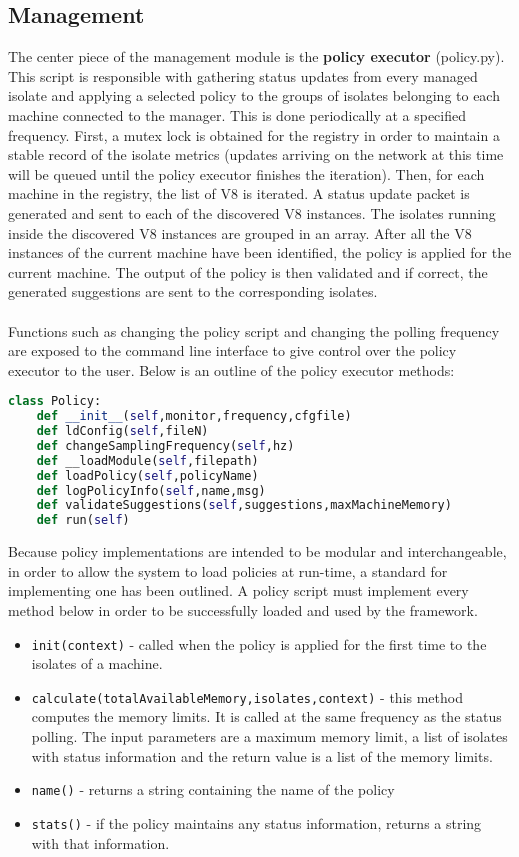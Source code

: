 \documentclass{l4proj}
\begin{document}
\subsection{Management}
\hspace*{3em} The center piece of the management module is the \textbf{policy executor} (policy.py). This script is responsible with gathering status updates from every managed isolate and applying a selected policy to the groups of isolates belonging to each machine connected to the manager. This is done periodically at a specified frequency. First, a mutex lock is obtained for the registry in order to maintain a stable record of the isolate metrics (updates arriving on the network at this time will be queued until the policy executor finishes the iteration). Then, for each machine in the registry, the list of V8 is iterated. A status update packet is generated and sent to each of the discovered V8 instances. The isolates running inside the discovered V8 instances are grouped in an array. After all the V8 instances of the current machine have been identified, the policy is applied for the current machine. The output of the policy is then validated and if correct, the generated suggestions are sent to the corresponding isolates. 
\\\\
Functions such as changing the policy script and changing the polling frequency are exposed to the command line interface to give control over the policy executor to the user. Below is an outline of the policy executor methods:
\begin{lstlisting}[language=python]
class Policy:
    def __init__(self,monitor,frequency,cfgfile)
    def ldConfig(self,fileN)
    def changeSamplingFrequency(self,hz)
    def __loadModule(self,filepath)
    def loadPolicy(self,policyName)
    def logPolicyInfo(self,name,msg)
    def validateSuggestions(self,suggestions,maxMachineMemory)
    def run(self)
\end{lstlisting}
\hspace*{3em} Because policy implementations are intended to be modular and interchangeable, in order to allow the system to load policies at run-time, a standard for implementing one has been outlined. A policy script must implement every method below in order to be successfully loaded and used by the framework. 
\begin{itemize}
\item \texttt{init(context)} - called when the policy is applied for the first time to the isolates of a machine.
\item \texttt{calculate(totalAvailableMemory,isolates,context)} - this method computes the memory limits. It is called at the same frequency as the status polling. The input parameters are a maximum memory limit, a list of isolates with status information and the return value is a list of the memory limits.
\item \texttt{name()} - returns a string containing the name of the policy
\item \texttt{stats()} - if the policy maintains any status information, returns a string with that information.
\end{itemize}
\end{document}
